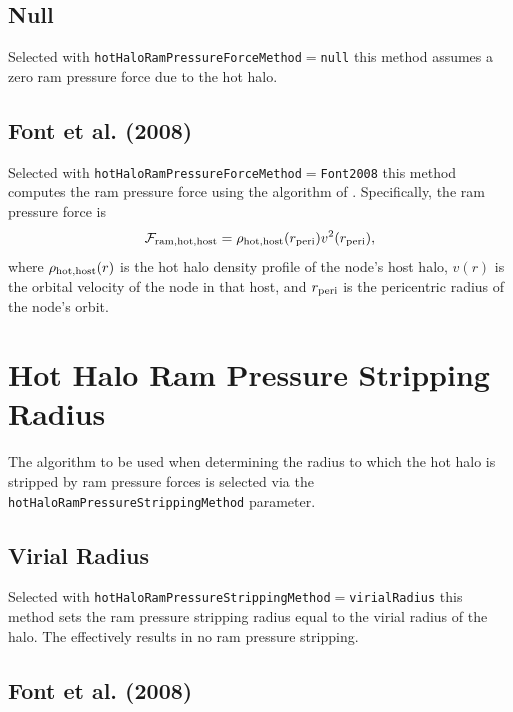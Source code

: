 \subsection{Null}

Selected with {\tt hotHaloRamPressureForceMethod}$=${\tt null} this method assumes a zero ram pressure force due to the hot halo.

\subsection{Font et al. (2008)}

Selected with {\tt hotHaloRamPressureForceMethod}$=${\tt Font2008} this method computes the ram pressure force using the algorithm of \cite{font_colours_2008}. Specifically, the ram pressure force is
\begin{equation}
\mathcal{F}_{\rm ram, hot, host} = \rho_{\rm hot, host}(r_{\rm peri}) v^2(r_{\rm peri}),
\end{equation}
where $\rho_{\rm hot, host}(r)$ is the hot halo density profile of the node's host halo, $v(r)$ is the orbital velocity of the node in that host, and $r_{\rm peri}$ is the pericentric radius of the node's orbit.

\section{Hot Halo Ram Pressure Stripping Radius}\label{sec:HotHaloRamPressureStrip}

The algorithm to be used when determining the radius to which the hot halo is stripped by ram pressure forces is selected via the {\tt hotHaloRamPressureStrippingMethod} parameter.

\subsection{Virial Radius}

Selected with {\tt hotHaloRamPressureStrippingMethod}$=${\tt virialRadius} this method sets the ram pressure stripping radius equal to the virial radius of the halo. The effectively results in no ram pressure stripping.

\subsection{Font et al. (2008)}

